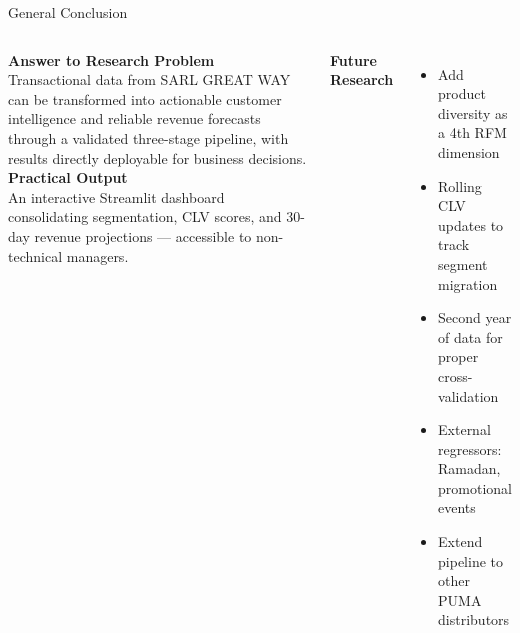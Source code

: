 \documentclass[aspectratio=169,12pt]{beamer}
\begin{document}
\begin{frame}{General Conclusion}
\vspace{-2pt}
\begin{center}
\end{center}
\vspace{4pt}
\begin{columns}[t]
  \textbf{\color{PumaRed}\small Answer to Research Problem}\\[3pt]
  {\scriptsize Transactional data from SARL GREAT WAY can be transformed into actionable customer intelligence and reliable revenue forecasts through a validated three-stage pipeline, with results directly deployable for business decisions.}\\[5pt]

  \textbf{\color{PumaRed}\small Practical Output}\\[3pt]
  {\scriptsize An interactive Streamlit dashboard consolidating segmentation, CLV scores, and 30-day revenue projections — accessible to non-technical managers.}

  \textbf{\color{PumaRed}\small Future Research}
  \begin{itemize}\scriptsize
    \item Add product diversity as a 4th RFM dimension
    \item Rolling CLV updates to track segment migration
    \item Second year of data for proper cross-validation
    \item External regressors: Ramadan, promotional events
    \item Extend pipeline to other PUMA distributors
  \end{itemize}
\end{columns}
\end{frame}
\end{document}
